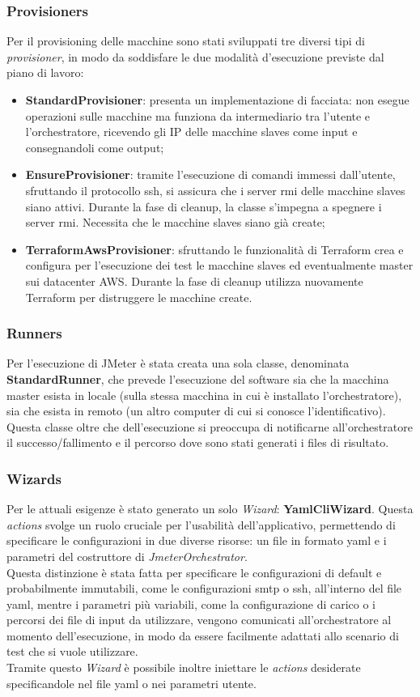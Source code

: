 \subsubsection{Provisioners}
Per il provisioning delle macchine sono stati sviluppati tre diversi tipi di \textit{provisioner}, in modo da soddisfare le due modalità d'esecuzione previste dal piano di lavoro:
\begin{itemize}
	\item \textbf{StandardProvisioner}: presenta un implementazione di facciata: non esegue operazioni sulle macchine ma funziona da intermediario tra l'utente e l'orchestratore, ricevendo gli IP delle macchine slaves come input e consegnandoli come output;
	\item \textbf{EnsureProvisioner}: tramite l'esecuzione di comandi immessi dall'utente, sfruttando il protocollo \gls{ssh}, si assicura che i server \gls{rmi} delle macchine slaves siano attivi. Durante la fase di cleanup, la classe s'impegna a spegnere i server \gls{rmi}. Necessita che le macchine slaves siano già create;
	\item \textbf{TerraformAwsProvisioner}: sfruttando le funzionalità di Terraform crea e configura per l'esecuzione dei test le macchine slaves ed eventualmente master sui \gls{datacenter} AWS. Durante la fase di cleanup utilizza nuovamente Terraform per distruggere le macchine create.
\end{itemize}
\subsubsection{Runners}
Per l'esecuzione di JMeter è stata creata una sola classe, denominata \textbf{StandardRunner}, che prevede l'esecuzione del software sia che la macchina master esista in locale (sulla stessa macchina in cui è installato l'orchestratore), sia che esista in remoto (un altro computer di cui si conosce l'identificativo). Questa classe oltre che dell'esecuzione si preoccupa di notificarne all'orchestratore il successo/fallimento e il percorso dove sono stati generati i files di risultato.
\subsubsection{Wizards}
Per le attuali esigenze è stato generato un solo \textit{Wizard}: \textbf{YamlCliWizard}. Questa \textit{actions} svolge un ruolo cruciale per l'usabilità dell'applicativo, permettendo di specificare le configurazioni in due diverse risorse: un file in formato \gls{yaml} e i parametri del costruttore di \textit{JmeterOrchestrator}. \\
Questa distinzione è stata fatta per specificare le configurazioni di default e probabilmente immutabili, come le configurazioni \gls{smtp} o \gls{ssh}, all'interno del file \gls{yaml}, mentre i parametri più variabili, come la configurazione di carico o i percorsi dei file di input da utilizzare, vengono comunicati all'orchestratore al momento dell'esecuzione, in modo da essere facilmente adattati allo scenario di test che si vuole utilizzare. \\
Tramite questo \textit{Wizard} è possibile inoltre iniettare le \textit{actions} desiderate specificandole nel file \gls{yaml} o nei parametri utente.